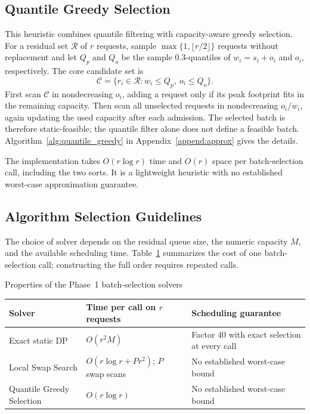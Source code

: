 \documentclass[nonblindrev]{informs3_hide}
\begin{document}
\subsection{Quantile Greedy Selection}

This heuristic combines quantile filtering with capacity-aware greedy selection. For a residual set $\mathcal R$ of $r$ requests, sample $\max\{1,\lfloor r/2\rfloor\}$ requests without replacement and let $Q_p$ and $Q_o$ be the sample $0.3$-quantiles of $w_i=s_i+o_i$ and $o_i$, respectively. The core candidate set is
\[
\mathcal C=\{r_i\in\mathcal R:w_i\le Q_p,\ o_i\le Q_o\}.
\]
First scan $\mathcal C$ in nondecreasing $o_i$, adding a request only if its peak footprint fits in the remaining capacity. Then scan all unselected requests in nondecreasing $o_i/w_i$, again updating the used capacity after each admission. The selected batch is therefore static-feasible; the quantile filter alone does not define a feasible batch. Algorithm~\ref{alg:quantile_greedy} in Appendix~\ref{append:approx} gives the details.

The implementation takes $O(r\log r)$ time and $O(r)$ space per batch-selection call, including the two sorts. It is a lightweight heuristic with no established worst-case approximation guarantee.

\subsection{Algorithm Selection Guidelines}

The choice of solver depends on the residual queue size, the numeric capacity $M$, and the available scheduling time. Table~\ref{tab:algorithm_comparison} summarizes the cost of one batch-selection call; constructing the full order requires repeated calls.
\begin{table}[htbp]
\centering
Properties of the Phase~1 batch-selection solvers
\label{tab:algorithm_comparison}
\small
\begin{tabular}{p{}p{}p{}}
\hline
Solver & Time per call on $r$ requests & Scheduling guarantee\\
\hline
Exact static DP & $O(r^2M)$ & Factor $40$ with exact selection at every call\\
Local Swap Search & $O(r\log r+Pr^2)$; $P$ swap scans & No established worst-case bound\\
Quantile Greedy Selection & $O(r\log r)$ & No established worst-case bound\\
\hline
\end{tabular}
\end{table}
\end{document}

